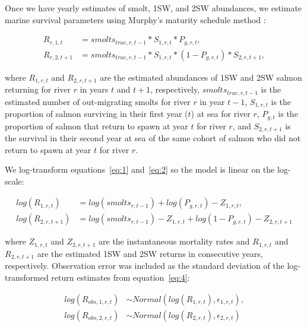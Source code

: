 \documentclass[12pt]{article}
\begin{document}
Once we have yearly estimates of smolt, 1SW, and 2SW abundances, we estimate
marine survival parameters using Murphy's maturity schedule method
\citep{Murphy1952, Ricker1975}:

\begin{align}
    R_{r,1,t} &= smolts_{true,r,t-1} * S_{1,r,t} * P_{g,r,t} \label{eq:1}, \\
    R_{r,2,t+1} &= smolts_{true,r,t-1} * S_{1,r,t} * (1 - P_{g,r,t}) * S_{2,r,t+1}, \label{eq:2}
\end{align}

where $R_{1,r,t}$ and $R_{2,r,t+1}$ are the estimated abundances of 1SW and 2SW
salmon returning for river $r$ in years $t$ and $t+1$, respectively, $smolts_{true,r,t-1}$ is the
estimated number of out-migrating smolts for river $r$ in year $t-1$, $S_{1,r,t}$ is the proportion of
salmon surviving in their first year ($t$) at sea for river $r$, $P_{g,t}$ is the proportion of
salmon that return to spawn at year $t$ for river $r$, and $S_{2,r,t+1}$ is the survival in their
second year at sea of the same cohort of salmon who did not return to spawn at
year $t$ for river $r$.

We log-transform equations~\ref{eq:1} and~\ref{eq:2} so the model
is linear on the log-scale:

\begin{align}
    log(R_{1,r,t}) &= log(smolts_{r,t-1}) + log(P_{g,r,t}) - Z_{1,r,t} \label{eq:3}, \\
    log(R_{2,r,t+1}) &= log(smolts_{r,t-1}) - Z_{1,r,t} + log(1 - P_{g,r,t})  - Z_{2,r,t+1} \label{eq:4}
\end{align}

where $Z_{1,r,t}$ and $Z_{2,r,t+1}$ are the instantaneous mortality rates and
$R_{1,r,t}$ and $R_{2,r,t+1}$ are the estimated 1SW and 2SW returns in
consecutive years, respectively. Observation error was included as the
standard deviation of the log-transformed return estimates from
equation~\ref{eq:4}:

\begin{align}
log(R_{obs,1,r,t}) &\sim Normal(log(R_{1,r,t}), \epsilon_{1,r,t}), \\
log(R_{obs,2,r,t}) &\sim Normal(log(R_{2,r,t}), \epsilon_{2,r,t}) \label{eq:5}
\end{align}
\end{document}
